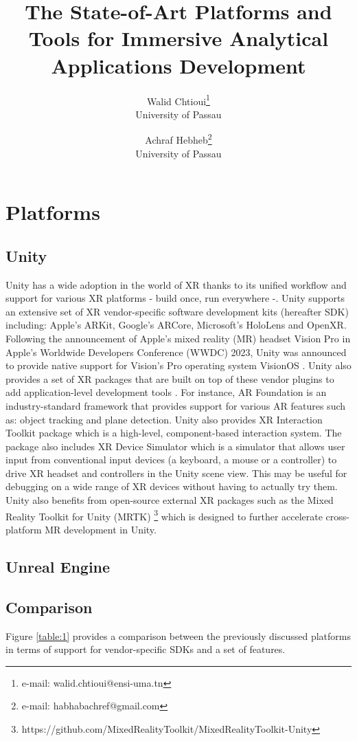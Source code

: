 \documentclass{vgtc}                          %
\title{The State-of-Art Platforms and Tools for Immersive Analytical
Applications Development}
\author{Walid Chtioui\thanks{e-mail: walid.chtioui@ensi-uma.tn}\\ %
        \scriptsize University of Passau %
\and Achraf Hebheb\thanks{e-mail: habhabachref@gmail.com}\\ %
     \scriptsize University of Passau}
\begin{document}
\maketitle



\section{Platforms}
\subsection{Unity}
Unity has a wide adoption in the world of XR thanks to its unified workflow
and support for various XR platforms - build once, run
everywhere -. Unity supports an extensive set of XR vendor-specific software
development kits (hereafter SDK) including: Apple's ARKit, Google's ARCore,
Microsoft's HoloLens and OpenXR. Following the announcement of Apple's
mixed reality (MR) headset Vision Pro in Apple's Worldwide Developers
Conference (WWDC) 2023, Unity was announced to provide native support for
Vision's Pro operating system VisionOS \cite{web:vision_pro_unity}.
Unity also provides a set of XR packages that are built on top of these vendor
plugins to add application-level development tools \cite{unity:xr_packages}.
For instance, AR Foundation is an industry-standard framework that provides
support for various AR features such as: object tracking and plane detection.
Unity also provides XR Interaction Toolkit package which is a high-level,
component-based interaction system. The package also includes XR Device
Simulator which is a simulator that allows user input from conventional input
devices (a keyboard, a mouse or a controller) to drive XR headset and
controllers in the Unity scene view. This may be useful for debugging on a
wide range of XR devices without having to actually try them. Unity also
benefits from open-source external XR packages such as the Mixed Reality
Toolkit for Unity (MRTK)
\footnote{https://github.com/MixedRealityToolkit/MixedRealityToolkit-Unity}
which is designed to further accelerate cross-platform MR development in Unity.
\subsection{Unreal Engine}
\subsection{Comparison}
Figure \ref{table:1} provides a comparison between the previously discussed
platforms in terms of support for vendor-specific SDKs and a set of features.
\end{document}

